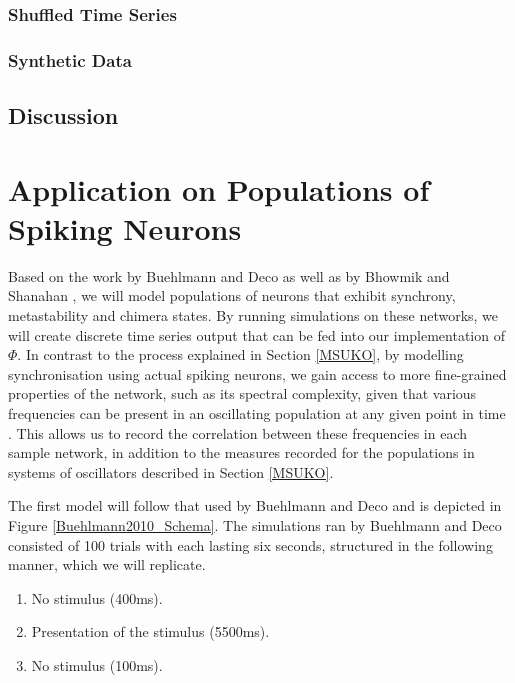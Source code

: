 \documentclass[a4paper,11pt]{article}
\begin{document}
\subsubsection{Shuffled Time Series}

\subsubsection{Synthetic Data}

\subsection{Discussion}


\clearpage
\section{Application on Populations of Spiking Neurons}
\label{MSUSNN}

Based on the work by Buehlmann and Deco \cite{Buehlmann2010} as well as by Bhowmik and Shanahan \cite{Bhowmik2013}, we will model populations of neurons that exhibit synchrony, metastability and chimera states. By running simulations on these networks, we will create discrete time series output that can be fed into our implementation of $\Phi$. In contrast to the process explained in Section \ref{MSUKO}, by modelling synchronisation using actual spiking neurons, we gain access to more fine-grained properties of the network, such as its spectral complexity, given that various frequencies can be present in an oscillating population at any given point in time \cite{Bhowmik2013}. This allows us to record the correlation between these frequencies in each sample network, in addition to the measures recorded for the populations in systems of oscillators described in Section \ref{MSUKO}.

The first model will follow that used by Buehlmann and Deco and is depicted in Figure \ref{Buehlmann2010_Schema}. The simulations ran by Buehlmann and Deco consisted of 100 trials with each lasting six seconds, structured in the following manner, which we will replicate.
\begin{enumerate}
\item{No stimulus (400ms).}
\item{Presentation of the stimulus (5500ms).}
\item{No stimulus (100ms)}.
\end{enumerate}
\end{document}
